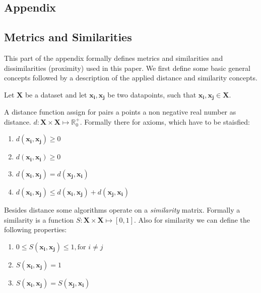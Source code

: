 \documentclass[12pt,a4paper,bibliography=totocnumbered,listof=totocnumbered]{scrartcl}
\begin{document}
\begin{appendix}
	
\section*{Appendix}
{}

\subsection*{Metrics and Similarities}

This part of the appendix formally defines metrics and similarities and dissimilarities (proximity) used in this paper. We first define some basic general concepts followed by a description of the applied distance and similarity concepts. 

Let $\boldsymbol{X}$ be a dataset and let $\boldsymbol{x_i},\boldsymbol{x_j}$ be two datapoints, such that $\boldsymbol{x_i},\boldsymbol{x_j} \in \boldsymbol{X}$. 

A distance function assign for pairs a points a non negative real number as distance. $d:\boldsymbol{X}\times \boldsymbol{X} \mapsto \mathbb{R}_0^+$. Formally there for axioms, which have to be staisfied:

\begin{enumerate}
	\setlength{\itemsep}{-5pt}
	\item $d(\boldsymbol{x_i},\boldsymbol{x_j}) \ge 0$
	\item $d(\boldsymbol{x_i},\boldsymbol{x_i}) \ge 0$
	\item $d(\boldsymbol{x_i},\boldsymbol{x_j}) = d(\boldsymbol{x_j},\boldsymbol{x_i}) $
	\item $d(\boldsymbol{x_i},\boldsymbol{x_j}) \le d(\boldsymbol{x_i},\boldsymbol{x_j})+ d(\boldsymbol{x_j},\boldsymbol{x_i}) $
\end{enumerate}

Besides distance some algorithms operate on a \textit{similarity} matrix. Formally a similarity is a function  $ S : \boldsymbol{X} \times \boldsymbol{X} \mapsto [0,1] $. Also for similarity we can define the following properties:

\begin{enumerate}
	\setlength{\itemsep}{-5pt}
	\item $0 \le S(\boldsymbol{x_i},\boldsymbol{x_j}) \le 1, \text{for } i \neq j$
	\item $S(\boldsymbol{x_i},\boldsymbol{x_j}) = 1$
	\item $S(\boldsymbol{x_i},\boldsymbol{x_j}) = S(\boldsymbol{x_j},\boldsymbol{x_i})$
\end{enumerate}


\end{appendix}
\end{document}
